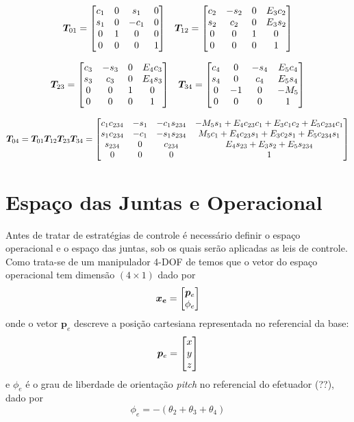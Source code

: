 \begin{align*}
\bm{T}_{01} = 
\begin{bmatrix}c_1 & 0 & s_1 &  0 \\
   s_1 & 0 & -c_1 & 0 \\
   0   & 1 &    0 & 0 \\
   0   & 0 &    0 & 1\end{bmatrix}
& &
\bm{T}_{12} =  \begin{bmatrix}c_2 & -s_2 &  0 & E_3 c_2 \\
   s_2 &  c_2 &  0 & E_3 s_2  \\
   0   &    0 &  1 & 	   0  \\
   0   &    0 &  0 &       1\end{bmatrix} 
\end{align*}

\begin{align*}
\bm{T}_{23} = 
\begin{bmatrix}c_3 & -s_3 &  0 & E_4 c_3 \\
   s_3 &  c_3 &  0 & E_4 s_3  \\
   0   &    0 &  1 & 	   0  \\
   0   &    0 &  0 &       1\end{bmatrix}
& &
\bm{T}_{34} = 
\begin{bmatrix}c_4 &    0 &  -s_4 & E_5 c_4 \\
   s_4 &    0 &   c_4 & E_5 s_4 \\
   0   &   -1 &     0 & 	-M_5 \\
   0   &    0 &     0 &       1\end{bmatrix}
\end{align*}


\begin{equation} \label{eq:cine_direta}
 \bm{T}_{04} = \bm{T}_{01} \bm{T}_{12}  \bm{T}_{23} \bm{T}_{34} = 
\begin{bmatrix}
   c_1 c_{234} & -s_1 & -c_1 s_{234} & -M_5 s_1 + E_4 c_{23}c_1 + E_3 c_1 c_2 + E_5 c_{234} c_1 \\
   s_1 c_{234} & -c_1 & -s_1 s_{234} &   M_5 c_1+E_4 c_{23} s_1 + E_3 c_2 s_1 + E_5 c_{234} s_1 \\
   s_{234}     &    0 &      c_{234} &					     E_4 s_{23} + E_3 s_2 + E_5 s_{234} \\
   0   &    0 &     0 &      												   1
\end{bmatrix} 
\end{equation}

\section{Espaço das Juntas e Operacional}
Antes de tratar de estratégias de controle é necessário definir o espaço operacional e o espaço das juntas,  sob os quais serão aplicadas as leis de controle. 
Como trata-se de um manipulador 4-DOF de temos que o vetor do espaço operacional tem dimensão $(4 \times 1)$ dado por 
\begin{equation}
\bm{x_e} = \begin{bmatrix}\bm{p}_e \\ \phi_e\end{bmatrix}
\end{equation}
onde o vetor $\bm{p}_e$ descreve a posição cartesiana representada no referencial da base:
\begin{equation}
\bm{p}_e = \begin{bmatrix}x \\ y \\ z\end{bmatrix}
\end{equation}
e $\phi_e$ é o grau de liberdade de orientação \textit{pitch} no referencial do efetuador (??), dado por
\begin{equation} \label{eq:orientacao}
\phi_e = -(\theta_2 + \theta_3 + \theta_4)
\end{equation}

